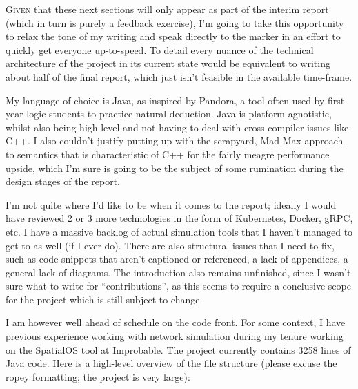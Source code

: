 \lettrine{G}{iven} that these next sections will only appear as part of the interim report (which in turn is purely a
feedback exercise), I'm going to take this opportunity to relax the tone of my writing and speak directly to the
marker in an effort to quickly get everyone up-to-speed. To detail every nuance of the technical architecture of the
project in its current state would be equivalent to writing about half of the final report, which just isn't feasible
in the available time-frame.

My language of choice is Java, as inspired by Pandora, a tool often used by first-year logic students to practice
natural deduction. Java is platform agnotistic, whilst also being high level and not having to deal with
cross-compiler issues like C++. I also couldn't justify putting up with the scrapyard, Mad Max approach to semantics
that is characteristic of C++ for the fairly meagre performance upside, which I'm sure is going to be the subject of
some rumination during the design stages of the report.

I'm not quite where I'd like to be when it comes to the report; ideally I would have reviewed 2 or 3 more
technologies in the form of Kubernetes, Docker, gRPC, etc. I have a massive backlog of actual simulation tools that I
haven't managed to get to as well (if I ever do). There are also structural issues that I need to fix, such as code
snippets that aren't captioned or referenced, a lack of appendices, a general lack of diagrams. The introduction also
remains unfinished, since I wasn't sure what to write for ``contributions'', as this seems to require a conclusive
scope for the project which is still subject to change.

I am however well ahead of schedule on the code front. For some context, I have previous experience working with
network simulation during my tenure working on the SpatialOS tool at Improbable. The project currently contains 3258
lines of Java code. Here is a high-level overview of the file structure (please excuse the ropey formatting; the
project is very large):

